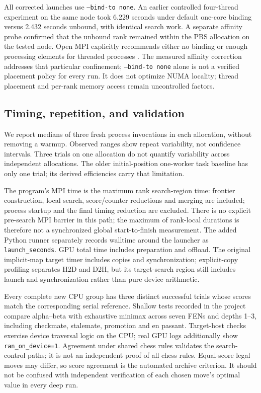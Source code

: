\documentclass[11pt,a4paper]{article}
\newcommand{\code}[1]{\texttt{#1}}
\begin{document}
All corrected launches use \code{--bind-to none}. An earlier controlled
four-thread experiment on the same node took 6.229 seconds under default
one-core binding versus 2.432 seconds unbound, with identical search work.
A separate affinity probe confirmed that the unbound rank remained within the
PBS allocation on the tested node. Open MPI explicitly recommends either no
binding or enough processing elements for threaded processes \cite{mpi}.
The measured affinity correction addresses that particular confinement;
\code{--bind-to none} alone is not a verified placement policy for every run.
It does not optimize NUMA locality;
thread placement and per-rank memory access remain uncontrolled factors.

\subsection{Timing, repetition, and validation}
We report medians of three fresh process invocations in each allocation, without
removing a warmup. Observed ranges show repeat variability, not confidence
intervals. Three trials on one allocation do not quantify variability across
independent allocations. The older initial-position one-worker task baseline
has only one trial; its derived efficiencies carry that limitation.

The program's MPI time is the maximum rank search-region time: frontier
construction, local search, score/counter reductions and merging are included;
process startup and the final timing reduction are excluded. There is no
explicit pre-search MPI barrier in this path; the maximum of rank-local
durations is therefore not a synchronized global start-to-finish measurement. The added Python
runner separately records walltime around the launcher as \code{launch\_seconds}.
GPU total time includes preparation and offload. The original implicit-map
target timer includes copies and synchronization; explicit-copy profiling
separates H2D and D2H, but its target-search region still includes launch and
synchronization rather than pure device arithmetic.

Every complete new CPU group has three distinct successful trials whose scores
match the corresponding serial reference. Shallow tests recorded in the project
compare alpha--beta with exhaustive minimax across seven FENs and depths 1--3,
including checkmate, stalemate, promotion and en passant. Target-host checks
exercise device traversal logic on the CPU; real GPU logs additionally show
\code{ran\_on\_device=1}. Agreement under shared chess rules validates the
search-control paths; it is not an independent proof of all chess rules.
Equal-score legal moves may differ, so score agreement is the automated archive
criterion. It should not be confused with independent verification of each
chosen move's optimal value in every deep run.
\end{document}
